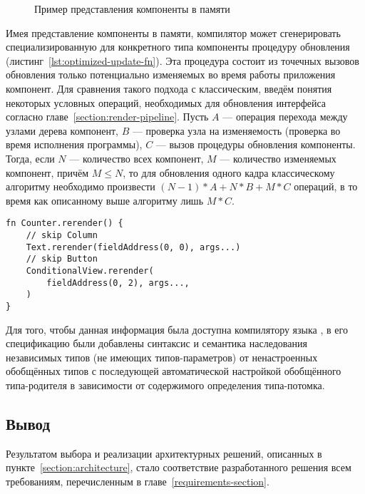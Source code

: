 \begin{figure}[H]
\centering
{}
\caption{Пример представления компоненты в памяти}
\label{component-layout-example}
\end{figure}
Имея представление компоненты в
памяти, компилятор может сгенерировать специализированную для конкретного
типа компоненты процедуру обновления
(листинг~\ref{lst:optimized-update-fn}). Эта процедура состоит из точечных
вызовов обновления только потенциально изменяемых во время работы приложения
компонент. Для сравнения такого подхода с классическим, введём понятия
некоторых условных операций, необходимых для обновления интерфейса согласно
главе~\ref{section:render-pipeline}. Пусть $A$ --- операция перехода между
узлами дерева компонент, $B$ --- проверка узла на изменяемость (проверка во
время исполнения программы), $C$ --- вызов процедуры обновления компоненты.
Тогда, если $N$ --- количество всех компонент, $M$ --- количество изменяемых
компонент, причём $M \leq N$, то для обновления одного кадра классическому
алгоритму необходимо произвести $(N - 1) * A + N * B + M * C$ операций,
в то время как описанному выше алгоритму лишь $M * C$.
\begin{lstlisting}[language=my_pseudo, caption=Пример сгенерированной процедуры обновления компоненты, label={lst:optimized-update-fn}]
fn Counter.rerender() {
    // skip Column
    Text.rerender(fieldAddress(0, 0), args...)
    // skip Button
    ConditionalView.rerender(
        fieldAddress(0, 2), args...,
    )
}
\end{lstlisting}
Для того, чтобы данная информация была доступна компилятору языка
, в его спецификацию были добавлены синтаксис и семантика
наследования независимых типов (не имеющих типов-параметров) от
ненастроенных обобщённых типов с последующей автоматической настройкой
обобщённого типа-родителя в зависимости от содержимого определения
типа-потомка.

\subsection{Вывод}
Результатом выбора и реализации архитектурных решений, описанных в
пункте~\ref{section:architecture}, стало соответствие разработанного
решения всем требованиям, перечисленным в главе~\ref{requirements-section}.
